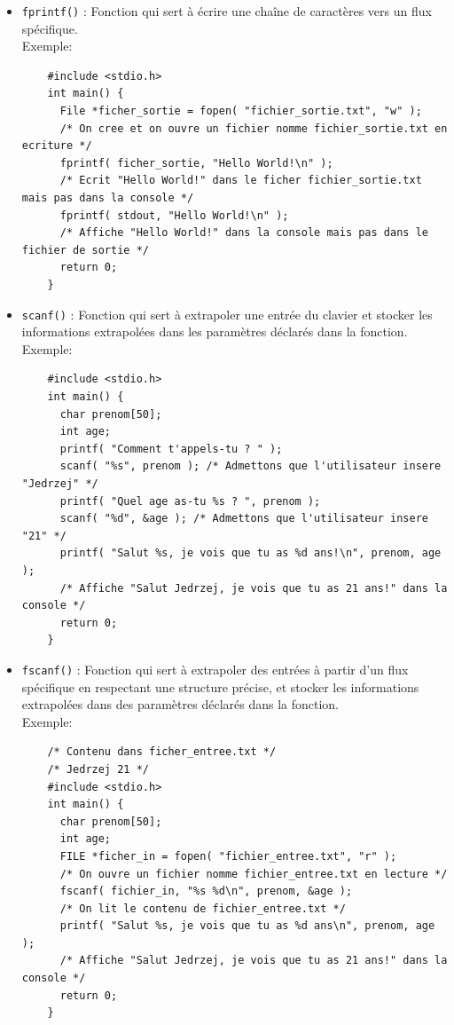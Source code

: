 \documentclass[11pt]{article}
\begin{document}
\begin{itemize}
\item \texttt{fprintf()} : Fonction qui sert à écrire une chaîne de caractères vers un flux spécifique.\\
  Exemple:
  \begin{lstlisting}
    #include <stdio.h>
    int main() {
      File *ficher_sortie = fopen( "fichier_sortie.txt", "w" );
      /* On cree et on ouvre un fichier nomme fichier_sortie.txt en ecriture */
      fprintf( ficher_sortie, "Hello World!\n" );
      /* Ecrit "Hello World!" dans le ficher fichier_sortie.txt mais pas dans la console */
      fprintf( stdout, "Hello World!\n" );
      /* Affiche "Hello World!" dans la console mais pas dans le fichier de sortie */
      return 0;
    }
  \end{lstlisting}

\item \texttt{scanf()} : Fonction qui sert à extrapoler une entrée du clavier et stocker les informations extrapolées dans les paramètres déclarés dans la fonction.\\
  Exemple:
  \begin{lstlisting}
    #include <stdio.h>
    int main() {
      char prenom[50];
      int age;
      printf( "Comment t'appels-tu ? " );
      scanf( "%s", prenom ); /* Admettons que l'utilisateur insere "Jedrzej" */
      printf( "Quel age as-tu %s ? ", prenom );
      scanf( "%d", &age ); /* Admettons que l'utilisateur insere "21" */
      printf( "Salut %s, je vois que tu as %d ans!\n", prenom, age );
      /* Affiche "Salut Jedrzej, je vois que tu as 21 ans!" dans la console */
      return 0;
    }
  \end{lstlisting}
  
\item \texttt{fscanf()} : Fonction qui sert à extrapoler des entrées à partir d'un flux spécifique en respectant une structure précise, et stocker les informations extrapolées dans des paramètres déclarés dans la fonction.\\
  Exemple:
  \begin{lstlisting}
    /* Contenu dans ficher_entree.txt */
    /* Jedrzej 21 */
    #include <stdio.h>
    int main() {
      char prenom[50];
      int age;
      FILE *ficher_in = fopen( "fichier_entree.txt", "r" );
      /* On ouvre un fichier nomme fichier_entree.txt en lecture */
      fscanf( fichier_in, "%s %d\n", prenom, &age );
      /* On lit le contenu de fichier_entree.txt */
      printf( "Salut %s, je vois que tu as %d ans\n", prenom, age );
      /* Affiche "Salut Jedrzej, je vois que tu as 21 ans!" dans la console */
      return 0;
    }
  \end{lstlisting}
  

\end{itemize}
\end{document}
